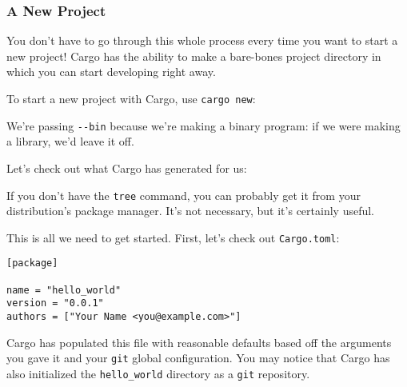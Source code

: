 \documentclass[a4paper,]{book}
\newenvironment{Shaded}{\begin{snugshade}}{\end{snugshade}}
\newcommand{\KeywordTok}[1]{\textcolor[rgb]{0.13,0.29,0.53}{\textbf{{#1}}}}
\newcommand{\NormalTok}[1]{{#1}}
\begin{document}
\subsubsection{A New Project}\label{a-new-project}

You don't have to go through this whole process every time you want to
start a new project! Cargo has the ability to make a bare-bones project
directory in which you can start developing right away.

To start a new project with Cargo, use \texttt{cargo\ new}:

\begin{Shaded}
\end{Shaded}

We're passing \texttt{-\/-bin} because we're making a binary program: if
we were making a library, we'd leave it off.

Let's check out what Cargo has generated for us:

\begin{Shaded}
\end{Shaded}

If you don't have the \texttt{tree} command, you can probably get it
from your distribution's package manager. It's not necessary, but it's
certainly useful.

This is all we need to get started. First, let's check out
\texttt{Cargo.toml}:

\begin{verbatim}
[package]

name = "hello_world"
version = "0.0.1"
authors = ["Your Name <you@example.com>"]
\end{verbatim}

Cargo has populated this file with reasonable defaults based off the
arguments you gave it and your \texttt{git} global configuration. You
may notice that Cargo has also initialized the \texttt{hello\_world}
directory as a \texttt{git} repository.
\end{document}
